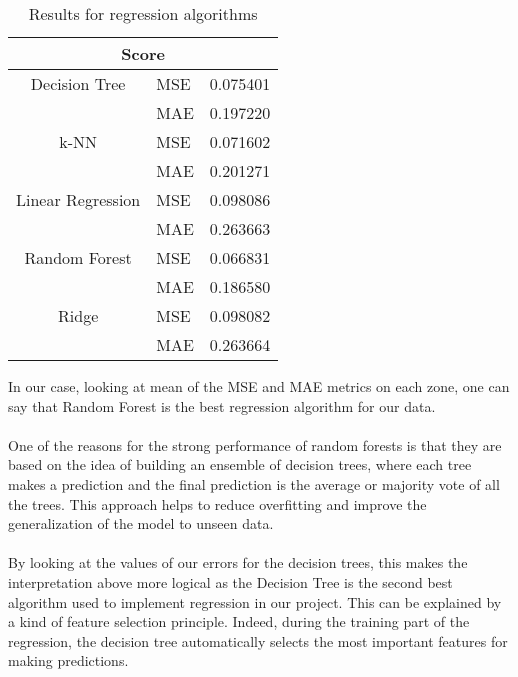 \begin{table}[H]
\centering
\begin{tabular}{|cll|}
\hline
\multicolumn{3}{|c|}{Score}                                                             \\ \hline
\multicolumn{1}{|c|}{Decision Tree}     & \multicolumn{1}{l|}{MSE} &  0.075401 \\ \cline{2-3} 
\multicolumn{1}{|c|}{}                                   & \multicolumn{1}{l|}{MAE}  &  0.197220\\ \hline
\multicolumn{1}{|c|}{k-NN}              & \multicolumn{1}{l|}{MSE} &  0.071602\\ \cline{2-3} 
\multicolumn{1}{|c|}{}                                   & \multicolumn{1}{l|}{MAE}  &  0.201271\\ \hline
\multicolumn{1}{|c|}{Linear Regression} & \multicolumn{1}{l|}{MSE} &  0.098086\\ \cline{2-3} 
\multicolumn{1}{|c|}{}                                   & \multicolumn{1}{l|}{MAE}  & 0.263663 \\ \hline
\multicolumn{1}{|c|}{Random Forest}    & \multicolumn{1}{l|}{MSE} & 0.066831 \\ \cline{2-3} 
\multicolumn{1}{|c|}{}                                   & \multicolumn{1}{l|}{MAE}  &  0.186580\\ \hline
\multicolumn{1}{|c|}{Ridge}            & \multicolumn{1}{l|}{MSE} &  0.098082\\ \cline{2-3} 
\multicolumn{1}{|c|}{}                                   & \multicolumn{1}{l|}{MAE}  &  0.263664\\ \hline
\end{tabular}
\caption{Results for regression algorithms}
\end{table}

In our case, looking at mean of the MSE and MAE metrics on each zone, one can say that Random Forest is the best regression algorithm for our data. 
\paragraph{}
One of the reasons for the strong performance of random forests is that they are based on the idea of building an ensemble of decision trees, where each tree makes a prediction and the final prediction is the average or majority vote of all the trees. This approach helps to reduce overfitting and improve the generalization of the model to unseen data.
\paragraph{}
By looking at the values of our errors for the decision trees, this makes the interpretation above more logical as the Decision Tree is the second best algorithm used to implement regression in our project. This can be explained by a kind of feature selection principle. Indeed, during the training part of the regression, the decision tree automatically selects the most important features for making predictions.
